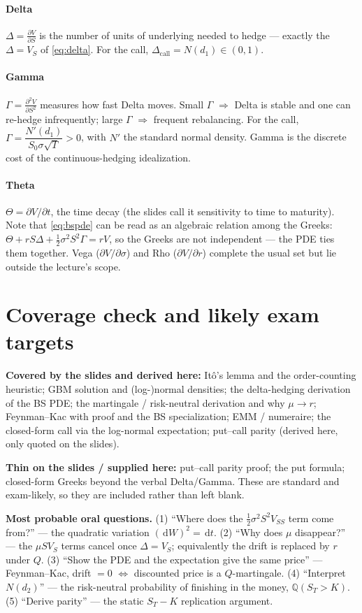 \documentclass[11pt]{article}
\newcommand{\dd}{\,\mathrm{d}}
\begin{document}
\paragraph{Delta} $\displaystyle \Delta = \frac{\partial V}{\partial S}$ is the number of units of
underlying needed to hedge --- exactly the $\Delta=V_S$ of \eqref{eq:delta}. For the call,
$\Delta_{\text{call}} = N(d_1) \in (0,1)$.

\paragraph{Gamma} $\displaystyle \Gamma = \frac{\partial^2 V}{\partial S^2}$ measures how fast Delta
moves. Small $\Gamma$ $\Rightarrow$ Delta is stable and one can re-hedge infrequently; large $\Gamma$
$\Rightarrow$ frequent rebalancing. For the call,
$\Gamma = \dfrac{N'(d_1)}{S_0\sigma\sqrt T}>0$, with $N'$ the standard normal density. Gamma is the
discrete cost of the continuous-hedging idealization.

\paragraph{Theta} $\Theta = \partial V/\partial t$, the time decay (the slides call it sensitivity to
time to maturity). Note that \eqref{eq:bspde} can be read as an algebraic relation among the Greeks:
$\Theta + rS\Delta + \tfrac12\sigma^2 S^2\Gamma = rV$, so the Greeks are not independent --- the PDE
ties them together. Vega ($\partial V/\partial\sigma$) and Rho ($\partial V/\partial r$) complete the
usual set but lie outside the lecture's scope.

\section{Coverage check and likely exam targets}
\textbf{Covered by the slides and derived here:} It\^o's lemma and the order-counting heuristic; GBM
solution and (log-)normal densities; the delta-hedging derivation of the BS PDE; the martingale /
risk-neutral derivation and why $\mu\to r$; Feynman--Kac with proof and the BS specialization; EMM /
numeraire; the closed-form call via the log-normal expectation; put--call parity (derived here, only
quoted on the slides).

\textbf{Thin on the slides / supplied here:} put--call parity proof; the put formula; closed-form
Greeks beyond the verbal Delta/Gamma. These are standard and exam-likely, so they are included rather
than left blank.

\textbf{Most probable oral questions.} (1) ``Where does the $\tfrac12\sigma^2 S^2 V_{SS}$ term come
from?'' --- the quadratic variation $(\dd W)^2=\dd t$. (2) ``Why does $\mu$ disappear?'' --- the
$\mu S V_S$ terms cancel once $\Delta=V_S$; equivalently the drift is replaced by $r$ under $Q$.
(3) ``Show the PDE and the expectation give the same price'' --- Feynman--Kac, drift $=0$
$\Leftrightarrow$ discounted price is a $Q$-martingale. (4) ``Interpret $N(d_2)$'' --- the
risk-neutral probability of finishing in the money, $\mathbb Q(S_T>K)$. (5) ``Derive parity'' ---
the static $S_T-K$ replication argument.
\end{document}
